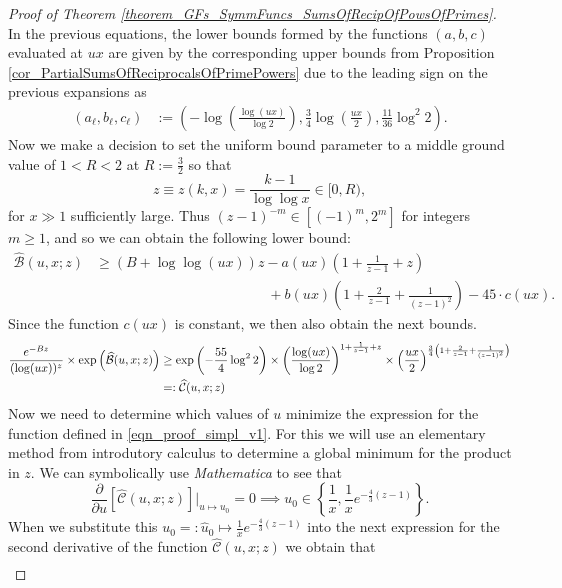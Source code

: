 \documentclass[11pt,reqno,a4letter]{article}
\numberwithin{figure}{section}
\numberwithin{table}{section}
\theoremstyle{plain}
\numberwithin{theorem}{section}
\theoremstyle{definition}
\begin{document}
\begin{proof}[Proof of Theorem \ref{theorem_GFs_SymmFuncs_SumsOfRecipOfPowsOfPrimes}]
In the previous equations, the lower bounds formed by the functions $(a,b,c)$ 
evaluated at $ux$ are 
given by the corresponding upper bounds from 
Proposition \ref{cor_PartialSumsOfReciprocalsOfPrimePowers} 
due to the leading sign on the previous expansions as 
\begin{align*} 
(a_{\ell}, b_{\ell}, c_{\ell}) & := \left(-\log\left(\frac{\log (ux)}{\log 2}\right), 
     \frac{3}{4} \log\left(\frac{ux}{2}\right), \frac{11}{36} \log^2 2\right). 
\end{align*} 
Now we make a decision to set the uniform bound parameter to a middle ground value of 
$1 < R < 2$ at $R := \frac{3}{2}$ 
so that $$z \equiv z(k, x) = \frac{k-1}{\log\log x} \in [0, R),$$ 
for $x \gg 1$ sufficiently large. 
Thus $(z-1)^{-m} \in [(-1)^m, 2^m]$ for integers $m \geq 1$, and so we can obtain the 
following lower bound: 
\begin{align*} 
\widehat{\mathcal{B}}(u, x; z) & \geq (B + \log\log (ux)) z - a(ux) \left(1 + \frac{1}{z-1} + z\right) \\ 
     & \phantom{= (B + \log\log (ux)) z\ } + 
     b(ux) \left( 
     1 + \frac{2}{z-1} + \frac{1}{(z-1)^2}\right) - 
     45 \cdot c(ux). 
\end{align*} 
Since the function $c(ux)$ is constant, we then also obtain the next bounds. 
\begin{align} 
\notag 
\frac{e^{-Bz}}{(\log (ux))^{z}} \times \exp\left(\widehat{\mathcal{B}}(u, x; z)\right) & \geq 
    \exp\left(-\frac{55}{4} \log^2 2\right) \times \left(\frac{\log(ux)}{\log 2}\right)^{1 + \frac{1}{z-1} + z} 
     \times \left(\frac{ux}{2}\right)^{\frac{3}{4}\left(1 + \frac{2}{z-1} + \frac{1}{(z-1)^2}\right)} \\ 
\label{eqn_proof_simpl_v1} 
     & =: \widehat{\mathcal{C}}(u, x; z) 
\end{align} 
Now we need to determine which values of $u$ minimize the expression for the function defined 
in \eqref{eqn_proof_simpl_v1}. 
For this we will use an elementary method from 
introdutory calculus to determine a global minimum for the product in $z$. 
We can symbolically use \emph{Mathematica} to see that 
\[
\frac{\partial}{\partial u}\left[\widehat{\mathcal{C}}(u, x; z)\right] \Biggr\rvert_{u \mapsto u_0} = 0 \implies 
     u_0 \in \left\{\frac{1}{x}, \frac{1}{x} e^{-\frac{4}{3}(z-1)}\right\}. 
\]
When we substitute this $u_0 =: \hat{u}_0 \mapsto \frac{1}{x} e^{-\frac{4}{3}(z-1)}$ 
into the next expression for the second derivative of the function 
$\widehat{\mathcal{C}}(u, x; z)$ we obtain that 
\begin{align*} 

\end{align*}
\end{proof}
\end{document}
